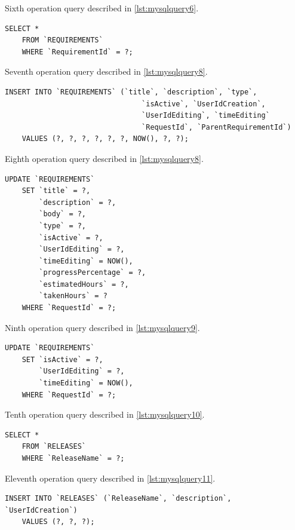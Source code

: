 \documentclass[12pt, a4paper]{report}
\begin{document}
Sixth operation query described in \autoref{lst:mysqlquery6}.

\begin{lstlisting}[language=MySQL, caption={op. 6}, label={lst:mysqlquery6}]
    SELECT *
    FROM `REQUIREMENTS`
    WHERE `RequirementId` = ?;
\end{lstlisting}

Seventh operation query described in \autoref{lst:mysqlquery8}.

\begin{lstlisting}[language=MySQL, caption={op. 7}, label={lst:mysqlquery7}]
    INSERT INTO `REQUIREMENTS` (`title`, `description`, `type`,
                                `isActive`, `UserIdCreation`,
                                `UserIdEditing`, `timeEditing`
                                `RequestId`, `ParentRequirementId`)
    VALUES (?, ?, ?, ?, ?, ?, NOW(), ?, ?);
\end{lstlisting}

Eighth operation query described in \autoref{lst:mysqlquery8}.

\begin{lstlisting}[language=MySQL, caption={op. 8}, label={lst:mysqlquery8}]
    UPDATE `REQUIREMENTS`
    SET `title` = ?,
        `description` = ?,
        `body` = ?,
        `type` = ?,
        `isActive` = ?,
        `UserIdEditing` = ?,
        `timeEditing` = NOW(),
        `progressPercentage` = ?,
        `estimatedHours` = ?,
        `takenHours` = ?
    WHERE `RequestId` = ?;
\end{lstlisting}

Ninth operation query described in \autoref{lst:mysqlquery9}.

\begin{lstlisting}[language=MySQL, caption={op. 9}, label={lst:mysqlquery9}]
    UPDATE `REQUIREMENTS`
    SET `isActive` = ?,
        `UserIdEditing` = ?,
        `timeEditing` = NOW(),
    WHERE `RequestId` = ?;
\end{lstlisting}

Tenth operation query described in \autoref{lst:mysqlquery10}.

\begin{lstlisting}[language=MySQL, caption={op. 10}, label={lst:mysqlquery10}]
    SELECT *
    FROM `RELEASES`
    WHERE `ReleaseName` = ?;
\end{lstlisting}

Eleventh operation query described in \autoref{lst:mysqlquery11}.

\begin{lstlisting}[language=MySQL, caption={op. 11}, label={lst:mysqlquery11}]
    INSERT INTO `RELEASES` (`ReleaseName`, `description`, `UserIdCreation`)
    VALUES (?, ?, ?);
\end{lstlisting}
\end{document}
